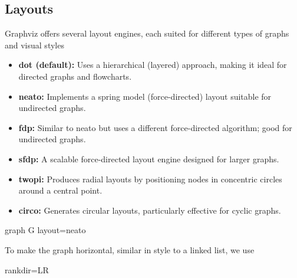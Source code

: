 \documentclass{report}
\begin{document}
     \subsection{Layouts}
     \bigbreak \noindent 
     Graphviz offers several layout engines, each suited for different types of graphs and visual styles
     \begin{itemize}
         \item \textbf{dot (default):} Uses a hierarchical (layered) approach, making it ideal for directed graphs and flowcharts.
         \item \textbf{neato:} Implements a spring model (force-directed) layout suitable for undirected graphs.
         \item \textbf{fdp:} Similar to neato but uses a different force-directed algorithm; good for undirected graphs.
         \item \textbf{sfdp:} A scalable force-directed layout engine designed for larger graphs.
         \item \textbf{twopi:} Produces radial layouts by positioning nodes in concentric circles around a central point.
         \item \textbf{circo:} Generates circular layouts, particularly effective for cyclic graphs.
     \end{itemize}

     \bigbreak \noindent 
     \begin{cppcode}
         graph G {
             layout=neato
         }
     \end{cppcode}

     \pagebreak 
     \bigbreak \noindent 
     To make the graph horizontal, similar in style to a linked list, we use
     \bigbreak \noindent 
     \begin{cppcode}
     rankdir=LR
     \end{cppcode}
\end{document}
